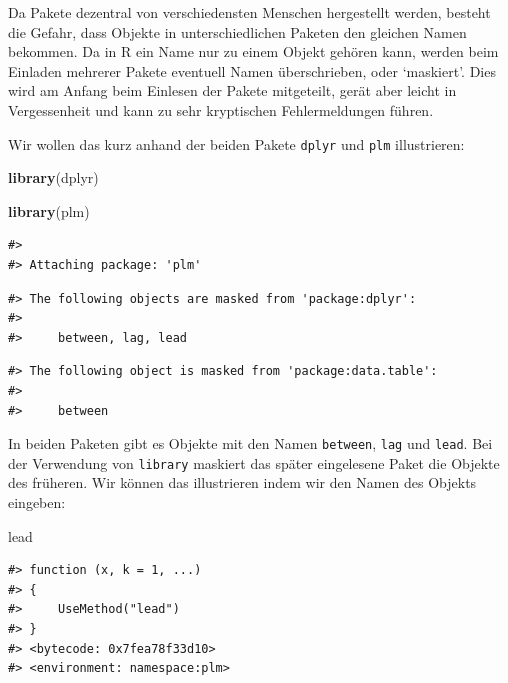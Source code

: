 \documentclass[]{tufte-book}
\newenvironment{Shaded}{}{}
\newcommand{\KeywordTok}[1]{\textcolor[rgb]{0.00,0.44,0.13}{\textbf{#1}}}
\newcommand{\NormalTok}[1]{#1}
\begin{document}
Da Pakete dezentral von verschiedensten Menschen hergestellt werden,
besteht die Gefahr, dass Objekte in unterschiedlichen Paketen den
gleichen Namen bekommen. Da in R ein Name nur zu einem Objekt gehören
kann, werden beim Einladen mehrerer Pakete eventuell Namen
überschrieben, oder `maskiert'. Dies wird am Anfang beim Einlesen der
Pakete mitgeteilt, gerät aber leicht in Vergessenheit und kann zu sehr
kryptischen Fehlermeldungen führen.

Wir wollen das kurz anhand der beiden Pakete \texttt{dplyr} und
\texttt{plm} illustrieren:

\begin{Shaded}
\begin{Highlighting}[]
\KeywordTok{library}\NormalTok{(dplyr)}
\end{Highlighting}
\end{Shaded}

\begin{Shaded}
\begin{Highlighting}[]
\KeywordTok{library}\NormalTok{(plm)}
\end{Highlighting}
\end{Shaded}

\begin{verbatim}
#> 
#> Attaching package: 'plm'
\end{verbatim}

\begin{verbatim}
#> The following objects are masked from 'package:dplyr':
#> 
#>     between, lag, lead
\end{verbatim}

\begin{verbatim}
#> The following object is masked from 'package:data.table':
#> 
#>     between
\end{verbatim}

In beiden Paketen gibt es Objekte mit den Namen \texttt{between},
\texttt{lag} und \texttt{lead}. Bei der Verwendung von \texttt{library}
maskiert das später eingelesene Paket die Objekte des früheren. Wir
können das illustrieren indem wir den Namen des Objekts eingeben:

\begin{Shaded}
\begin{Highlighting}[]
\NormalTok{lead}
\end{Highlighting}
\end{Shaded}

\begin{verbatim}
#> function (x, k = 1, ...) 
#> {
#>     UseMethod("lead")
#> }
#> <bytecode: 0x7fea78f33d10>
#> <environment: namespace:plm>
\end{verbatim}
\end{document}
